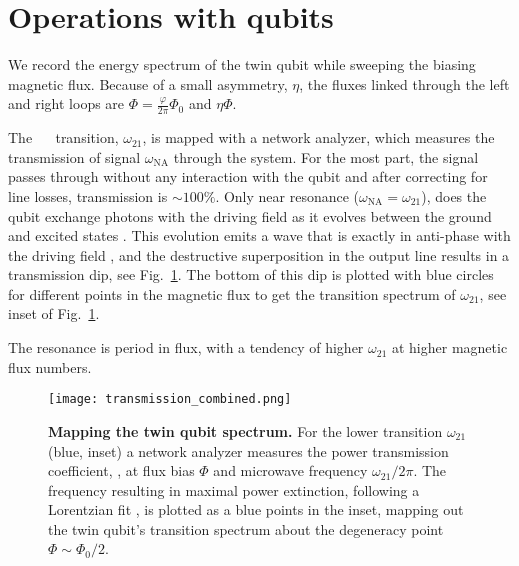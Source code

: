 
\section{Operations with qubits}
\label{sec:characterisation}



\noindent We record the energy spectrum of  the twin qubit while sweeping the biasing magnetic
flux.  Because of a  small asymmetry, $\eta$, the fluxes linked through the  left and right loops
are $ \Phi = \frac{\varphi}{2\pi}\Phi_0$ and $ \eta\Phi $.

The ~\ilra~  transition, $\omega_{21}$,  is mapped with  a network  analyzer, which
measures the  transmission of signal $\omega_{\text{NA}}$  through the system.  For  the most part,
the signal passes through without any interaction with the qubit and after correcting for line
losses,     transmission     is     $     \sim      100\%     $.      Only     near     resonance
($\omega_{\text{NA}}=\omega_{21}$), does the qubit exchange photons with the driving field as it evolves
between the ground and excited states \cite{rabi}. This evolution emits a wave that is exactly
in anti-phase with the driving field \cite{abdumalikov2010}, and the destructive superposition
in the output line results in  a transmission dip, see Fig.~\ref{fig:transmission}. The bottom
of this dip is plotted with blue circles for  different points in the magnetic flux to get the
transition spectrum of $\omega_{21}$, see inset of Fig.~\ref{fig:transmission}.

The resonance is  period in flux, with a  tendency of higher $\omega_{21}$ at  higher magnetic flux
numbers.

\begin{figure}[h]
  \centering \texttt{[image: transmission\_combined.png]}
  \caption{\small  \textbf{Mapping  the  twin  qubit  spectrum.}   For  the  lower  transition
    $\omega_{21}$ (blue,  inset) a  network analyzer measures  the power  transmission coefficient,
    , at flux bias  $ \Phi $ and microwave frequency  $ \omega_{21}/2\pi$.  The frequency
    resulting in maximal power extinction,  following a Lorentzian fit \cite{Astafiev2010}, is
    plotted as a  blue points in the  inset, mapping out the twin  qubit's transition spectrum
    about the degeneracy point $ \Phi \sim \Phi_{0}/2 $.}
  \label{fig:transmission}
\end{figure}

